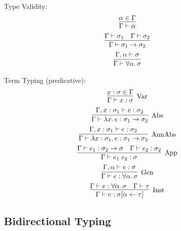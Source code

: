 Type Validity:
\begin{gather*}
  \infer{
    \Gamma \vdash \alpha
  }{
    \alpha \in \Gamma
  }
  \\
  \infer{
    \Gamma \vdash \sigma_1 \to \sigma_2
  }{
    \Gamma \vdash \sigma_1
    &
    \Gamma \vdash \sigma_2
  }
  \\
  \infer{
    \Gamma \vdash \forall \alpha\ldotp \sigma
  }{
    \Gamma, \alpha \vdash \sigma
  }
\end{gather*}

Term Typing (predicative):
\begin{gather*}
  \infer[\text{Var}]{
    \Gamma \vdash x: \sigma
  }{
    x:\sigma \in \Gamma
  }
  \\
  \infer[\text{Abs}]{
    \Gamma \vdash \lambda x\ldotp e: \sigma_1 \to \sigma_2
  }{
    \Gamma, x: \sigma_1\vdash e: \sigma_2
  }
  \\
  \infer[\text{AnnAbs}]{
    \Gamma \vdash \lambda x: \sigma_1\ldotp e: \sigma_1 \to \sigma_2
  }{
    \Gamma, x: \sigma_1\vdash e: \sigma_2
  }
  \\
  \infer[\text{App}]{
    \Gamma \vdash e_1\; e_2: \sigma
  }{
    \Gamma \vdash e_1: \sigma_2 \to \sigma
    &
    \Gamma \vdash e_2: \sigma_2
  }
  \\
  \infer[\text{Gen}]{
    \Gamma \vdash e: \forall \alpha\ldotp \sigma
  }{
    \Gamma, \alpha \vdash e: \sigma
  }
  \\
  \infer[\text{Inst}]{
    \Gamma \vdash e: \sigma[\alpha \assign \tau]
  }{
    \Gamma \vdash e: \forall \alpha\ldotp \sigma
    &
    \Gamma \vdash \tau
  }
\end{gather*}

\subsection{Bidirectional Typing}

